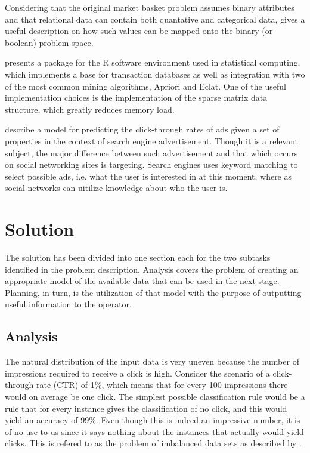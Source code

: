 \documentclass[a4paper]{article}
\begin{document}
Considering that the original market basket problem assumes binary attributes and that relational data can contain both quantative and categorical data, \citep{Srikant1996} gives a useful description on how such values can be mapped onto the binary (or boolean) problem space.

\citet{Hahsler2007} presents a package for the R software environment used in statistical computing, which implements a base for transaction databases as well as integration with two of the most common mining algorithms, Apriori and Eclat. One of the useful implementation choices is the implementation of the sparse matrix data structure, which greatly reduces memory load.

\citet{Richardson2007} describe a model for predicting the click-through rates of ads given a set of properties in the context of search engine advertisement. Though it is a relevant subject, the major difference between such advertisement and that which occurs on social networking sites is targeting. Search engines uses keyword matching to select possible ads, i.e. what the user is interested in at this moment, where as social networks can uitilize knowledge about who the user is.

\section{Solution}
The solution has been divided into one section each for the two subtasks identified in the problem description. Analysis covers the problem of creating an appropriate model of the available data that can be used in the next stage. Planning, in turn, is the utilization of that model with the purpose of outputting useful information to the operator.

\subsection{Analysis}
The natural distribution of the input data is very uneven because the number of impressions required to receive a click is high. Consider the scenario of a click-through rate (CTR) of 1\%, which means that for every 100 impressions there would on average be one click. The simplest possible classification rule would be a rule that for every instance gives the classification of no click, and this would yield an accuracy of 99\%. Even though this is indeed an impressive number, it is of no use to us since it says nothing about the instances that actually would yield clicks. This is refered to as the problem of imbalanced data sets as described by \citet{Chawla2004}.
\end{document}
